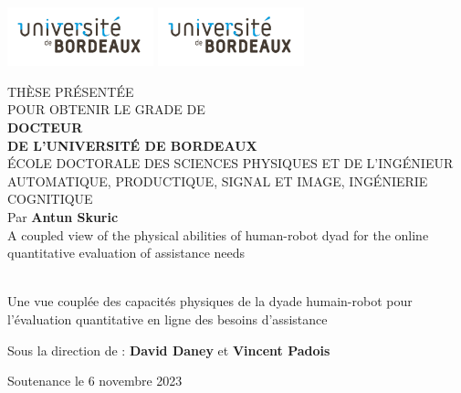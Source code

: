\documentclass[french,12pt,a4paper]{report}
\begin{document}
\pagestyle{empty}
\includegraphics[scale=1, height=1.7cm]{first_page/brdx.pdf}
\hfill
\includegraphics[scale=1, height=1.7cm]{first_page/brdx.pdf}
\hfill
\begin{center}
\doublespacing
\begin{large}
THÈSE PRÉSENTÉE\\ POUR OBTENIR LE GRADE DE \\
{\LARGE \textbf{DOCTEUR\\DE L'UNIVERSITÉ DE BORDEAUX} } \\
\vspace{0.55cm}
ÉCOLE DOCTORALE DES SCIENCES PHYSIQUES ET DE L’INGÉNIEUR \\
{\small AUTOMATIQUE, PRODUCTIQUE, SIGNAL ET IMAGE, INGÉNIERIE COGNITIQUE} \\
\vspace{0.35cm}
Par \textbf{Antun Skuric} \\
\vspace{0.35cm}
{\LARGE {A coupled view of the physical abilities of human-robot dyad for the
online quantitative evaluation of assistance needs}}
\end{large}\\
\vspace{0.15cm}\singlespacing 
{ \normalsize Une vue couplée des capacités physiques de la dyade humain-robot pour l'évaluation quantitative en ligne des besoins d'assistance}
\vspace{0.65cm}
\begin{normalsize}
\begin{singlespace}
Sous la direction de : \textbf{David Daney} et  \textbf{Vincent Padois}
\end{singlespace}
\end{normalsize}
\end{center}
\vfill
{\large Soutenance le 6 novembre 2023 }\\
\end{document}
